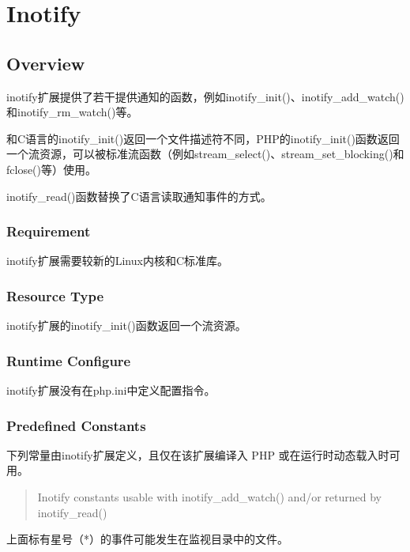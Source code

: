 \part{Inotify}

\chapter{Overview}


inotify扩展提供了若干提供通知的函数，例如inotify\_init()、inotify\_add\_watch()和inotify\_rm\_watch()等。

和C语言的inotify\_init()返回一个文件描述符不同，PHP的inotify\_init()函数返回一个流资源，可以被标准流函数（例如stream\_select()、stream\_set\_blocking()和fclose()等）使用。

inotify\_read()函数替换了C语言读取通知事件的方式。

\section{Requirement}


inotify扩展需要较新的Linux内核和C标准库。



\section{Resource Type}

inotify扩展的inotify\_init()函数返回一个流资源。

\section{Runtime Configure}

inotify扩展没有在php.ini中定义配置指令。

\section{Predefined Constants}

下列常量由inotify扩展定义，且仅在该扩展编译入 PHP 或在运行时动态载入时可用。

\begin{quote}
Inotify constants usable with inotify\_add\_watch() and/or returned by inotify\_read()
\end{quote}





上面标有星号（*）的事件可能发生在监视目录中的文件。

